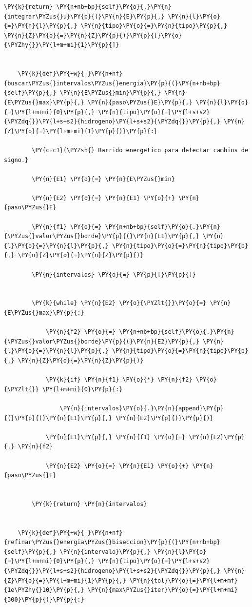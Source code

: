 \documentclass[11pt]{article}
\makeatletter
\def\PY@reset{\let\PY@it=\relax \let\PY@bf=\relax \let\PY@ul=\relax \let\PY@tc=\relax \let\PY@bc=\relax \let\PY@ff=\relax}
\def\PY@tok#1{\csname PY@tok@#1\endcsname}
\def\PY@toks#1+{\ifx\relax#1\empty\else \PY@tok{#1}\expandafter\PY@toks\fi}
\def\PY@do#1{\PY@bc{\PY@tc{\PY@ul{\PY@it{\PY@bf{\PY@ff{#1}}}}}}}
\def\PY#1#2{\PY@reset\PY@toks#1+\relax+\PY@do{#2}}
\makeatother
\begin{document}
\begin{tcolorbox}[breakable, size=fbox, boxrule=1pt, pad at break*=1mm,colback=cellbackground, colframe=cellborder]
\begin{Verbatim}[commandchars=\\\{\}]
        \PY{k}{return} \PY{n+nb+bp}{self}\PY{o}{.}\PY{n}{integrar\PYZus{}u}\PY{p}{(}\PY{n}{E}\PY{p}{,} \PY{n}{l}\PY{o}{=}\PY{n}{l}\PY{p}{,} \PY{n}{tipo}\PY{o}{=}\PY{n}{tipo}\PY{p}{,} \PY{n}{Z}\PY{o}{=}\PY{n}{Z}\PY{p}{)}\PY{p}{[}\PY{o}{\PYZhy{}}\PY{l+m+mi}{1}\PY{p}{]}


    \PY{k}{def}\PY{+w}{ }\PY{n+nf}{buscar\PYZus{}intervalos\PYZus{}energia}\PY{p}{(}\PY{n+nb+bp}{self}\PY{p}{,} \PY{n}{E\PYZus{}min}\PY{p}{,} \PY{n}{E\PYZus{}max}\PY{p}{,} \PY{n}{paso\PYZus{}E}\PY{p}{,} \PY{n}{l}\PY{o}{=}\PY{l+m+mi}{0}\PY{p}{,} \PY{n}{tipo}\PY{o}{=}\PY{l+s+s2}{\PYZdq{}}\PY{l+s+s2}{hidrogeno}\PY{l+s+s2}{\PYZdq{}}\PY{p}{,} \PY{n}{Z}\PY{o}{=}\PY{l+m+mi}{1}\PY{p}{)}\PY{p}{:}

        \PY{c+c1}{\PYZsh{} Barrido energetico para detectar cambios de signo.}

        \PY{n}{E1} \PY{o}{=} \PY{n}{E\PYZus{}min}

        \PY{n}{E2} \PY{o}{=} \PY{n}{E1} \PY{o}{+} \PY{n}{paso\PYZus{}E}

        \PY{n}{f1} \PY{o}{=} \PY{n+nb+bp}{self}\PY{o}{.}\PY{n}{\PYZus{}valor\PYZus{}borde}\PY{p}{(}\PY{n}{E1}\PY{p}{,} \PY{n}{l}\PY{o}{=}\PY{n}{l}\PY{p}{,} \PY{n}{tipo}\PY{o}{=}\PY{n}{tipo}\PY{p}{,} \PY{n}{Z}\PY{o}{=}\PY{n}{Z}\PY{p}{)}

        \PY{n}{intervalos} \PY{o}{=} \PY{p}{[}\PY{p}{]}


        \PY{k}{while} \PY{n}{E2} \PY{o}{\PYZlt{}}\PY{o}{=} \PY{n}{E\PYZus{}max}\PY{p}{:}

            \PY{n}{f2} \PY{o}{=} \PY{n+nb+bp}{self}\PY{o}{.}\PY{n}{\PYZus{}valor\PYZus{}borde}\PY{p}{(}\PY{n}{E2}\PY{p}{,} \PY{n}{l}\PY{o}{=}\PY{n}{l}\PY{p}{,} \PY{n}{tipo}\PY{o}{=}\PY{n}{tipo}\PY{p}{,} \PY{n}{Z}\PY{o}{=}\PY{n}{Z}\PY{p}{)}

            \PY{k}{if} \PY{n}{f1} \PY{o}{*} \PY{n}{f2} \PY{o}{\PYZlt{}} \PY{l+m+mi}{0}\PY{p}{:}

                \PY{n}{intervalos}\PY{o}{.}\PY{n}{append}\PY{p}{(}\PY{p}{(}\PY{n}{E1}\PY{p}{,} \PY{n}{E2}\PY{p}{)}\PY{p}{)}

            \PY{n}{E1}\PY{p}{,} \PY{n}{f1} \PY{o}{=} \PY{n}{E2}\PY{p}{,} \PY{n}{f2}

            \PY{n}{E2} \PY{o}{=} \PY{n}{E1} \PY{o}{+} \PY{n}{paso\PYZus{}E}


        \PY{k}{return} \PY{n}{intervalos}


    \PY{k}{def}\PY{+w}{ }\PY{n+nf}{refinar\PYZus{}energia\PYZus{}biseccion}\PY{p}{(}\PY{n+nb+bp}{self}\PY{p}{,} \PY{n}{intervalo}\PY{p}{,} \PY{n}{l}\PY{o}{=}\PY{l+m+mi}{0}\PY{p}{,} \PY{n}{tipo}\PY{o}{=}\PY{l+s+s2}{\PYZdq{}}\PY{l+s+s2}{hidrogeno}\PY{l+s+s2}{\PYZdq{}}\PY{p}{,} \PY{n}{Z}\PY{o}{=}\PY{l+m+mi}{1}\PY{p}{,} \PY{n}{tol}\PY{o}{=}\PY{l+m+mf}{1e\PYZhy{}10}\PY{p}{,} \PY{n}{max\PYZus{}iter}\PY{o}{=}\PY{l+m+mi}{300}\PY{p}{)}\PY{p}{:}


\end{Verbatim}
\end{tcolorbox}
\end{document}
